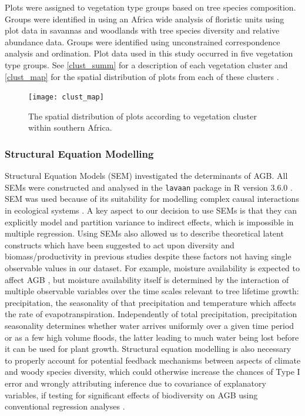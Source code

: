 \documentclass[11pt,a4paper]{article}
\begin{document}
Plots were assigned to vegetation type groups based on tree species composition. Groups were identified in \citet{Fayolle2018} using an Africa wide analysis of floristic units using plot data in savannas and woodlands with tree species diversity and relative abundance data. Groups were identified using unconstrained correspondence analysis and ordination. Plot data used in this study occurred in five vegetation type groups. See \autoref{clust_summ} for a description of each vegetation cluster and \autoref{clust_map} for the spatial distribution of plots from each of these clusters .

\begin{landscape}



\begin{figure}[H]
\centering
	\texttt{[image: clust\_map]}
	\caption{The spatial distribution of plots according to vegetation cluster within southern Africa.}
	\label{clust_map}
\end{figure}
\end{landscape}

\subsubsection{Structural Equation Modelling}

Structural Equation Models (SEM) investigated the determinants of AGB. All SEMs were constructed and analysed in the \verb|lavaan| package \citep{lavaan} in R version 3.6.0 \citep{R2019}. SEM was used because of its suitability for modelling complex causal interactions in ecological systems \citep{Lee2007}. A key aspect to our decision to use SEMs is that they can explicitly model and partition variance to indirect effects, which is impossible in multiple regression. Using SEMs also allowed us to describe theoretical latent constructs which have been suggested to act upon diversity and biomass/productivity in previous studies despite these factors not having single observable values in our dataset. For example, moisture availability is expected to affect AGB \citep{Saito2014, Campbell1996}, but moisture availability itself is determined by the interaction of multiple observable variables over the time scales relevant to tree lifetime growth: precipitation, the seasonality of that precipitation and temperature which affects the rate of evapotranspiration. Independently of total precipitation, precipitation seasonality determines whether water arrives uniformly over a given time period or as a few high volume floods, the latter leading to much water being lost before it can be used for plant growth. Structural equation modelling is also necessary to properly account for potential feedback mechanisms between aspects of climate and woody species diversity, which could otherwise increase the chances of Type I error and wrongly attributing inference due to covariance of explanatory variables, if testing for significant effects of biodiversity on AGB using conventional regression analyses \citep{Nachtigall2003}.
\end{document}
